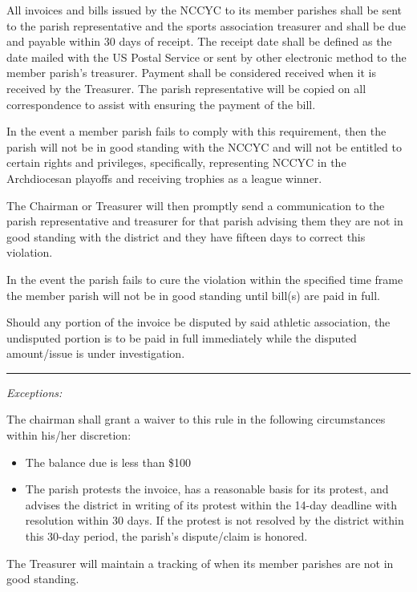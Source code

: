 \documentclass[letteraper,10pt,oneside,draft]{memoir}
\begin{document}
All invoices and bills issued by the NCCYC to its member parishes shall be sent to the parish representative and the sports association treasurer and shall be due and payable within 30 days of receipt.  The receipt date shall be defined as the date mailed with the US Postal Service or sent by other electronic method to the member parish’s treasurer.  Payment shall be considered received when it is received by the Treasurer.  The parish representative will be copied on all correspondence to assist with ensuring the payment of the bill.

In the event a member parish fails to comply with this requirement, then the parish will not be in good standing with the NCCYC and will not be entitled to certain rights and privileges, specifically, representing NCCYC in the Archdiocesan playoffs and receiving trophies as a league winner.

The Chairman or Treasurer will then promptly send a communication to the parish representative and treasurer for that parish advising them they are not in good standing with the district and they have fifteen days to correct this violation.

In the event the parish fails to cure the violation within the specified time frame the member parish will not be in good standing until bill(s) are paid in full.

Should any portion of the invoice be disputed by said athletic association, the undisputed portion is to be paid in full immediately while the disputed amount/issue is under investigation. 
\plainbreak{1}
{\em Exceptions:}

The chairman shall grant a waiver to this rule in the following circumstances within his/her discretion:
\begin{itemize}[\textbullet]
    \item The balance due is less than \$100
    \item The parish protests the invoice, has a reasonable basis for its protest, and advises the district in writing of its protest within the 14-day deadline with resolution within 30 days. If the protest is not resolved by the district within this 30-day period, the parish's dispute/claim is honored.
\end{itemize}

The Treasurer will maintain a tracking of when its member parishes are not in good standing.  
\end{document}
